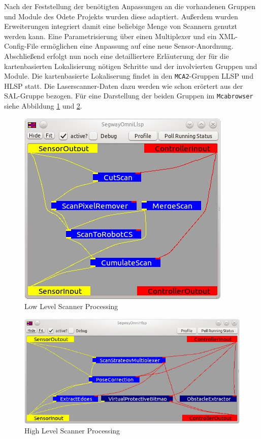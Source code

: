 Nach der Feststellung der benötigten Anpassungen an die vorhandenen Gruppen und Module des Odete Projekts wurden
 diese adaptiert. Außerdem wurden Erweiterungen integriert damit eine beliebige Menge von Scannern genutzt werden kann.
 Eine Parametrisierung über einen Multiplexer und ein XML-Config-File
 ermöglichen eine Anpassung auf eine neue Sensor-Anordnung. Abschließend erfolgt
 nun noch eine detailliertere Erläuterung der für die kartenbasierten
 Lokalisierung nötigen Schritte und der involvierten Gruppen und Module. Die kartenbasierte Lokaliserung
 findet in den \lstinline{MCA2}-Gruppen LLSP und HLSP statt. Die
 Laserscanner-Daten dazu werden wie schon erörtert aus der SAL-Gruppe bezogen.
 Für eine Darstellung der beiden Gruppen im \lstinline{Mcabrowser} siehe
 Abbildung \ref{fig:Llsp} und \ref{fig:Hlsp}.
 
\begin{figure}[h]
\center
\includegraphics[scale=0.7]{graphics/Llsp.jpg}
\caption{\label{fig:Llsp} Low Level Scanner Processing}
\end{figure}

\begin{figure}[h]
\center
\includegraphics[scale=0.7]{graphics/Hlsp.jpg}
\caption{\label{fig:Hlsp} High Level Scanner Processing}
\end{figure}
 

